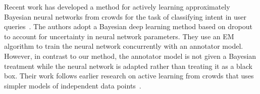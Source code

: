 Recent work has developed a method for actively learning approximately Bayesian neural networks from crowds
for the task of classifying intent in user queries~\cite{yang2018leveraging}.
The authors adopt a Bayesian deep learning method based on dropout~\cite{gal2016dropout}
to account for uncertainty in neural network parameters.
They use an EM algorithm to train the neural network concurrently with an annotator model.
However, in contrast to our method, 
the annotator model is not given a Bayesian treatment while 
the neural network is adapted rather than treating it as a black box.
Their work follows earlier research on active learning from crowds that uses simpler 
models of independent data points~\cite{fang2014active,simpson2015bayesian}. 

